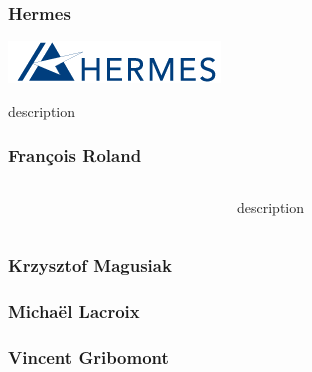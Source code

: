 \begin{frame}
\frametitle{Hermes}
\includegraphics[keepaspectratio,width=0.4\linewidth]{img/hermes}
\vspace{1cm}\par
description
\end{frame}

\begin{frame}
\frametitle{François Roland}
\begin{columns}
\begin{column}{0.4\linewidth}
\end{column}
\begin{column}{0.6\linewidth}
description
\end{column}
\end{columns}
\end{frame}

\begin{frame}
\frametitle{Krzysztof Magusiak}
\end{frame}

\begin{frame}
\frametitle{Michaël Lacroix}
\end{frame}

\begin{frame}
\frametitle{Vincent Gribomont}
\end{frame}

